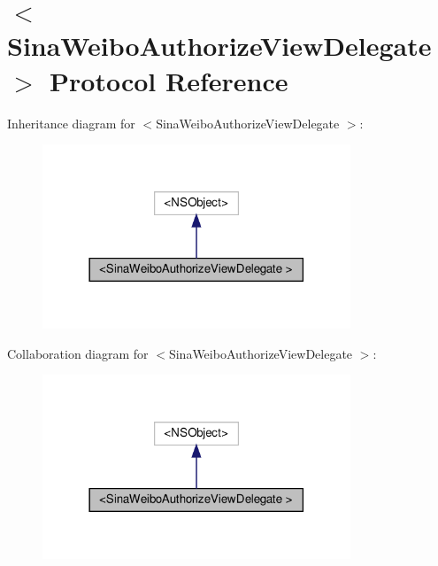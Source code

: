 \hypertarget{protocolSinaWeiboAuthorizeViewDelegate_01-p}{}\section{$<$Sina\+Weibo\+Authorize\+View\+Delegate $>$ Protocol Reference}
\label{protocolSinaWeiboAuthorizeViewDelegate_01-p}


Inheritance diagram for $<$Sina\+Weibo\+Authorize\+View\+Delegate $>$\+:
\nopagebreak
\begin{figure}[H]
\begin{center}
\leavevmode
\includegraphics[width=261pt]{protocolSinaWeiboAuthorizeViewDelegate_01-p__inherit__graph}
\end{center}
\end{figure}


Collaboration diagram for $<$Sina\+Weibo\+Authorize\+View\+Delegate $>$\+:
\nopagebreak
\begin{figure}[H]
\begin{center}
\leavevmode
\includegraphics[width=261pt]{protocolSinaWeiboAuthorizeViewDelegate_01-p__coll__graph}
\end{center}
\end{figure}
